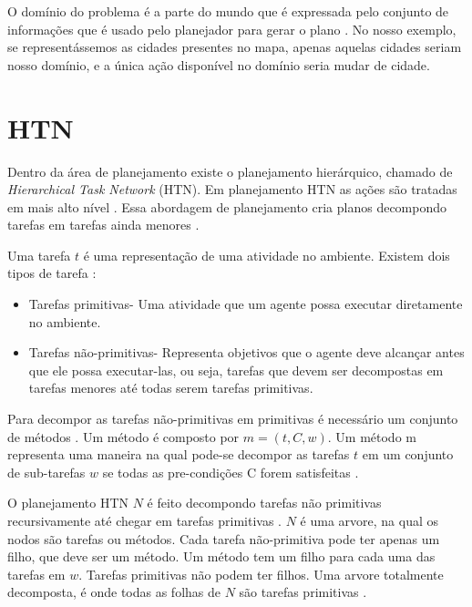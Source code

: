 O domínio do problema é a parte do mundo que é expressada pelo conjunto de informações que é usado pelo planejador para gerar o plano \cite{intelligence2003modern}. No nosso exemplo, se representássemos as cidades presentes no mapa, apenas aquelas cidades seriam nosso domínio, e a única ação disponível no domínio seria mudar de cidade.


\section{HTN} 

Dentro da área de planejamento existe o planejamento hierárquico, chamado de \textit{Hierarchical Task Network} (HTN). Em planejamento HTN as ações são tratadas em mais alto nível \cite{intelligence2003modern}. Essa abordagem de planejamento cria planos decompondo tarefas em tarefas ainda menores \cite{ontanon2015adversarial}.

Uma tarefa $t$ é uma representação de uma atividade no ambiente. Existem dois tipos de tarefa \cite{intelligence2003modern}: 

\begin{itemize}
	\item Tarefas primitivas- Uma atividade que um agente possa executar diretamente no ambiente.
	\item Tarefas não-primitivas- Representa objetivos que o agente deve alcançar antes que ele possa executar-las, ou seja, tarefas que devem ser decompostas em tarefas menores até todas serem tarefas primitivas. 
\end{itemize}

Para decompor as tarefas não-primitivas em primitivas é necessário um conjunto de métodos \cite{ghallab2004automated}. Um método é composto por $m = (t, C, w)$. Um método m representa uma maneira na qual pode-se decompor as tarefas $t$ em um conjunto de sub-tarefas $w$ se todas as pre-condições C forem satisfeitas \cite{ontanon2015adversarial}.

O planejamento HTN $N$ é feito decompondo tarefas não primitivas recursivamente até chegar em tarefas primitivas \cite{ghallab2004automated}. $N$ é uma arvore, na qual os nodos são tarefas ou métodos. Cada tarefa não-primitiva pode ter apenas um filho, que deve ser um método. Um método tem um filho para cada uma das tarefas em $w$. Tarefas primitivas não podem ter filhos. Uma arvore totalmente decomposta, é onde todas as folhas de $N$ são tarefas primitivas \cite{ontanon2015adversarial}.

